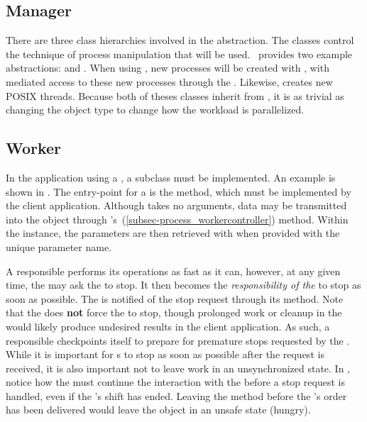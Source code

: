 \subsection{Manager}
\label{subsec-process_manager}

There are three class hierarchies involved in the abstraction.  
The  classes control the
technique of process manipulation that will be used.  \sname\ provides two
example abstractions:  and
.  When
using , new processes will be created with 
, with mediated access to these new processes through the
.  Likewise, 
creates new POSIX threads.  Because both of theses classes inherit from
, it is as trivial as changing the  object type
to change how the workload is parallelized.

\subsection{Worker}
\label{subsec-process_worker}

In the application using a , a  subclass must be
implemented.  An example  is shown in .
The entry-point for a  is the  method,
which must be implemented by the client application.  Although
 takes no arguments, data may be transmitted
into the object through
's~(\ref{subsec-process_workercontroller})
 method.  Within the  instance,
the parameters are then retrieved with  when
provided with the unique parameter name.

A responsible  performs its operations as fast as it can,
however, at any given time, the  may ask the  to
stop.  It then becomes the {\em responsibility of the } to 
stop as soon as possible.  The  is notified of the stop request
through its  method.  Note that the
 does \textbf{not} force the  to stop, though
prolonged work or cleanup in the  would likely produce
undesired results in the client application.  As such, a responsible
 checkpoints itself to prepare for premature stops requested by
the .  While it is important for s to stop as soon
as possible after the request is received, it is also important not to leave
work in an unsynchronized state.  In , notice how
the  must continue the interaction with the 
before a stop request is handled, even if the 's shift has
ended.  Leaving the method before the 's order has been
delivered would leave the  object in an unsafe state (hungry). 

